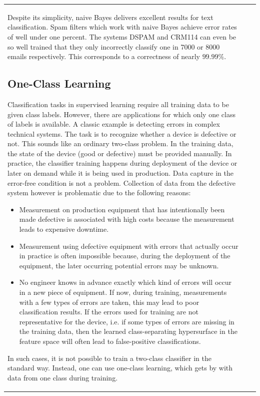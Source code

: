 \documentclass[10pt]{book}
\begin{document}
\begin{center}
\begin{tabular}{|l|l|l|}
Despite its simplicity, naive Bayes delivers excellent results for text classification. Spam filters which work with naive Bayes achieve error rates of well under one percent. The systems DSPAM and CRM114 can even be so well trained that they only incorrectly classify one in 7000 or 8000 emails respectively. This corresponds to a correctness of nearly $99.99 \%$.

\subsection{One-Class Learning}
Classification tasks in supervised learning require all training data to be given class labels. However, there are applications for which only one class of labels is available. A classic example is detecting errors in complex technical systems. The task is to recognize whether a device is defective or not. This sounds like an ordinary two-class problem. In the training data, the state of the device (good or defective) must be provided manually. In practice, the classifier training happens during deployment of the device or later on demand while it is being used in production. Data capture in the error-free condition is not a problem. Collection of data from the defective system however is problematic due to the following reasons:
\begin{itemize}
  \item Measurement on production equipment that has intentionally been made defective is associated with high costs because the measurement leads to expensive downtime.
  \item Measurement using defective equipment with errors that actually occur in practice is often impossible because, during the deployment of the equipment, the later occurring potential errors may be unknown.
  \item No engineer knows in advance exactly which kind of errors will occur in a new piece of equipment. If now, during training, measurements with a few types of errors are taken, this may lead to poor classification results. If the errors used for training are not representative for the device, i.e. if some types of errors are missing in the training data, then the learned class-separating hypersurface in the feature space will often lead to false-positive classifications.
\end{itemize}
In such cases, it is not possible to train a two-class classifier in the standard way. Instead, one can use one-class learning, which gets by with data from one class during training.


\end{tabular}
\end{center}
\end{document}
